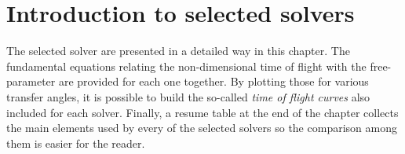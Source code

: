 \chapter{Introduction to selected solvers}
\label{performance_chapter}

The selected solver are presented in a detailed way in this chapter. The
fundamental equations relating the non-dimensional time of flight with the
free-parameter are provided for each one together. By plotting those for various
transfer angles, it is possible to build the so-called \textit{time of flight
curves} also included for each solver. Finally, a resume table at the end of the
chapter collects the main elements used by every of the selected solvers so the
comparison among them is easier for the reader.



